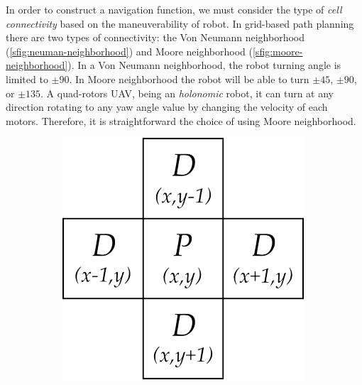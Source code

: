 In order to construct a navigation function, we must consider the type of \textit{cell connectivity} based on the maneuverability of robot. In grid-based path planning there are two types of connectivity: the Von Neumann neighborhood (\autoref{sfig:neuman-neighborhood}) and Moore neighborhood (\autoref{sfig:moore-neighborhood}). In a Von Neumann neighborhood, the  robot turning angle is limited to $\pm 90$. In Moore neighborhood the robot will be able to turn $\pm 45$, $\pm 90$, or $\pm 135$. A quad-rotors UAV, being an \textit{holonomic} robot, it can turn at any direction rotating to any yaw angle value by changing the velocity of each motors. Therefore, it is straightforward the choice of using Moore neighborhood.
\begin{figure}[ht]
\centering
\begin{subfigure}{.3\textwidth}
  \centering
  \includegraphics[width=.9\linewidth]{figures/C3/neumann-neighborhood.png}
  \caption{}
  \label{sfig:neuman-neighborhood}
\end{subfigure}
\hspace{2cm}
\begin{subfigure}{.3\textwidth}
  \centering

\end{subfigure}
\end{figure}
